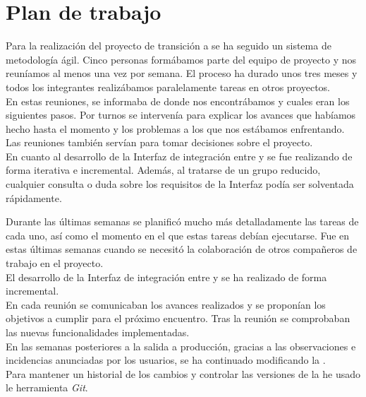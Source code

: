 \section{Plan de trabajo}

Para la realización del proyecto de transición a \wday{} se ha seguido un sistema de metodología ágil. 
Cinco personas formábamos parte del equipo de proyecto y nos reuníamos al menos una vez por semana.
El proceso ha durado unos tres meses y todos los integrantes realizábamos paralelamente tareas en otros proyectos.\\

En estas reuniones, se informaba de donde nos encontrábamos y cuales eran los siguientes pasos.
Por turnos se intervenía para explicar los avances que habíamos hecho hasta el momento y los problemas a los que nos estábamos enfrentando.
Las reuniones también servían para tomar decisiones sobre el proyecto.\\

En cuanto al desarrollo de la Interfaz de integración entre \hs{} y \wday{} se fue realizando de forma iterativa e incremental. 
Además, al tratarse de un grupo reducido, cualquier consulta o duda sobre los requisitos de la Interfaz podía ser solventada rápidamente.

Durante las últimas semanas se planificó mucho más detalladamente las tareas de cada uno, así como el momento en el que estas tareas debían ejecutarse.
Fue en estas últimas semanas cuando se necesitó la colaboración de otros compañeros de trabajo en el proyecto.\\

El desarrollo de la Interfaz de integración entre \hs{} y \wday{} se ha realizado de forma incremental.\\

En cada reunión se comunicaban los avances realizados y se proponían los objetivos a cumplir para el próximo encuentro. Tras la reunión se comprobaban las nuevas funcionalidades implementadas.\\

En las semanas posteriores a la salida a producción, gracias a las observaciones e incidencias anunciadas por los usuarios,
se ha continuado modificando la \iface{}. \\

Para mantener un historial de los cambios y controlar las versiones de la \iface{} he usado le herramienta \textit{Git}.
